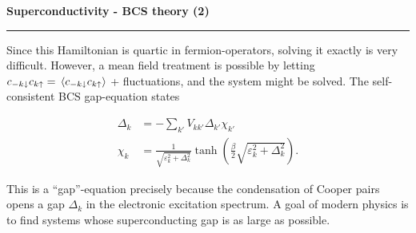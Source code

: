 \begin{frame}
	\begin{block}{\color{white}\textbf{\Large{
					Superconductivity - BCS theory (2)
		}}}
		\vspace{-10pt}\rule{\textwidth}{0.5pt}
		\color{white}
		Since this Hamiltonian is quartic in fermion-operators, solving it exactly is very difficult. However, a mean field treatment is possible by letting $c_{-k\downarrow}c_{k\uparrow} = \ev*{c_{-k\downarrow}c_{k\uparrow}}$ + fluctuations, and the system might be solved. The self-consistent BCS gap-equation states
		
	\end{block}
	{
			\begin{align*}
					\Delta_k &= -\sum_{k'}V_{kk'}\Delta_{k'}\chi_{k'} \\
					\chi_{k} &= \frac{1}{\sqrt{\varepsilon_k^2 + \Delta_k^2}}\tanh(\frac{\beta}{2}\sqrt{\varepsilon_k^2 + \Delta_k^2}).
			\end{align*}

	}
	
	\begin{block}{}
		\color{white}
		This is a ``gap''-equation precisely because the condensation of Cooper pairs opens a gap $\Delta_k$ in the electronic excitation spectrum. A goal of modern physics is to find systems whose superconducting gap is as large as possible. 
		
		
	\end{block}
	
	
\end{frame}